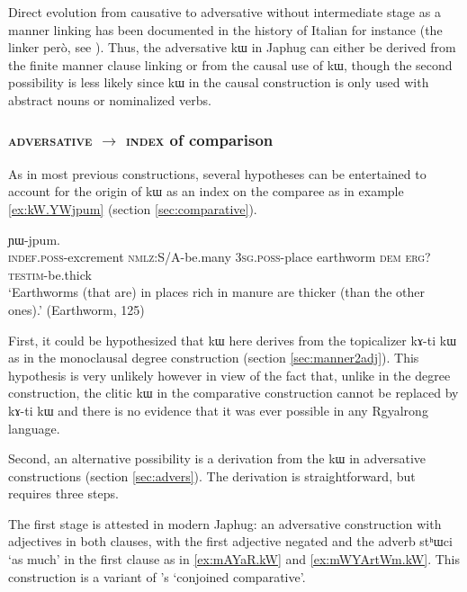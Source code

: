 \documentclass[oldfontcommands,oneside,a4paper,11pt]{article}
\newcommand{\ipa}[1]{{\phon #1}} %
\begin{document}
Direct evolution from causative to adversative without intermediate stage as a manner linking has been documented in the history of Italian for instance (the linker \ipa{però}, see  \citealt{mauri12adversative}). Thus, 
the adversative \ipa{kɯ} in Japhug can either be derived from the finite manner clause linking or from the causal use of  \ipa{kɯ}, though the second possibility is less likely since \ipa{kɯ} in the causal construction is only used with abstract nouns or nominalized verbs.
 
 
 
  \subsubsection{\textsc{adversative} $\rightarrow$ \textsc{index} of comparison}
  As in most previous constructions, several hypotheses can be entertained to account for the origin of \ipa{kɯ} as an index on the comparee as in example \ref{ex:kW.YWjpum}  (section \ref{sec:comparative}).
  
        \begin{exe}
  \ex  \label{ex:kW.YWjpum}  
  \gll 
  [\ipa{tɯ-ɣli} 	\ipa{kɯ-dɤn} 	\ipa{ɯ-stu} \ipa{qandʐe} 	\ipa{nɯ}] 	\ipa{kɯ} 	\ipa{ɲɯ-jpum.} \\
  \textsc{indef.poss}-excrement \textsc{nmlz}:S/A-be.many \textsc{3sg.poss}-place earthworm \textsc{dem} \textsc{erg?} \textsc{testim}-be.thick   \\
  \glt `Earthworms (that are) in places rich in manure are thicker (than the other ones).'
   (Earthworm, 125)
   \end{exe} 

  First, it could be hypothesized that \ipa{kɯ} here derives from the topicalizer \ipa{kɤ-ti kɯ}  as in the monoclausal degree construction (section \ref{sec:manner2adj}). This hypothesis is very unlikely however in view of the fact that, unlike in the degree construction, the clitic \ipa{kɯ} in the comparative construction cannot be replaced by \ipa{kɤ-ti kɯ} and there is no evidence that it was ever  possible in any Rgyalrong language.
  
  
Second, an alternative possibility is a derivation from the \ipa{kɯ} in adversative constructions (section \ref{sec:advers}). The derivation is straightforward, but requires three steps.

The first stage is attested in modern Japhug: an adversative construction with adjectives in both  clauses, with the first adjective negated and the adverb \ipa{stʰɯci} `as much' in the first clause as in \ref{ex:mAYaR.kW} and \ref{ex:mWYArtWm.kW}.  This construction is a variant of \citet{stassen11comparative}'s `conjoined comparative'.
\end{document}
